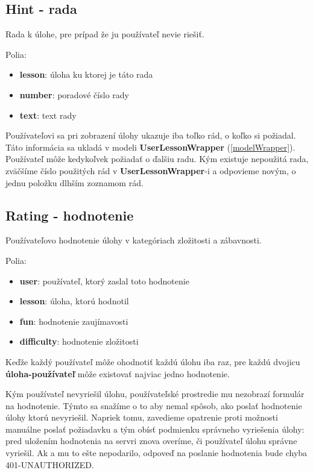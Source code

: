 \subsection{Hint - rada}
Rada k úlohe, pre prípad že ju používateľ nevie riešiť.

Polia:
\begin{itemize}
\item \textbf{lesson}: úloha ku ktorej je táto rada
\item \textbf{number}: poradové číslo rady
\item \textbf{text}: text rady
\end{itemize}

Používateľovi sa pri zobrazení úlohy ukazuje iba toľko rád, o koľko si požiadal. Táto
informácia sa ukladá v modeli \textbf{UserLessonWrapper} (\ref{modelWrapper}).
Používateľ môže kedykoľvek požiadať o ďalšiu radu. Kým existuje nepoužitá rada, zväčšíme
číslo použitých rád v \textbf{UserLessonWrapper}-i a odpovieme novým, o jednu položku dlhším zoznamom rád.

\subsection{Rating - hodnotenie}
Používateľovo hodnotenie úlohy v kategóriach zložitosti a zábavnosti.

Polia:
\begin{itemize}
\item \textbf{user}: používateľ, ktorý zaslal toto hodnotenie
\item \textbf{lesson}: úloha, ktorú hodnotil
\item \textbf{fun}: hodnotenie zaujímavosti
\item \textbf{difficulty}: hodnotenie zložitosti
\end{itemize}

Keďže každý používateľ môže ohodnotiť každú úlohu iba raz,
pre každú dvojicu \textbf{úloha-používateľ} môže existovať najviac jedno hodnotenie.

Kým používateľ nevyriešil úlohu, používateľské prostredie mu nezobrazí formulár na hodnotenie.
Týmto sa snažíme o to aby nemal spôsob, ako poslať hodnotenie úlohy ktorú nevyriešil.
Napriek tomu, zavedieme opatrenie proti
možnosti manuálne poslať požiadavku a tým obísť podmienku správneho vyriešenia úlohy:
pred uložením hodnotenia na servri znova overíme, či používateľ úlohu správne vyriešil.
Ak a mu to ešte nepodarilo, odpoveď na poslanie hodnotenia bude chyba 401-UNAUTHORIZED.

